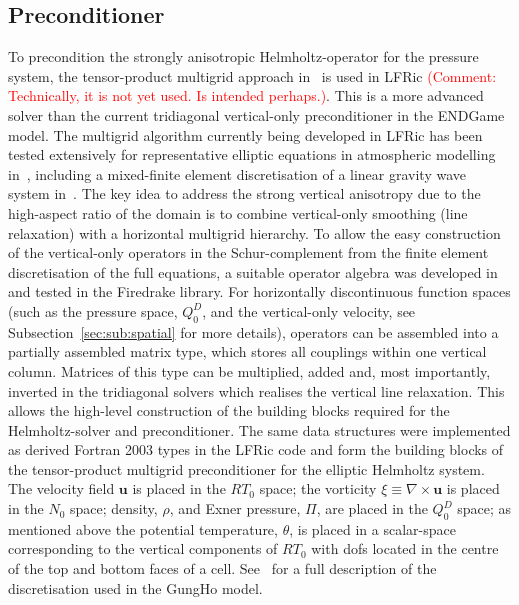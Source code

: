 \documentclass[times]{elsarticle}
\begin{document}
\subsection{\label{sec:sub:preconditioner}Preconditioner}

To precondition the strongly anisotropic Helmholtz-operator for the
pressure system, the tensor-product multigrid approach in~\cite{Borm2001} 
is used in LFRic \textcolor{red}{(Comment: Technically, it is not yet used. Is intended perhaps.)}. 
This is a more advanced solver than
the current tridiagonal vertical-only preconditioner in the ENDGame
model. The multigrid algorithm currently being developed in LFRic has been tested
extensively for representative elliptic equations in atmospheric
modelling in~\cite{Mueller2014,Dedner2016}, including a mixed-finite
element discretisation of a linear gravity wave system in~\cite{Mitchell2016}. 
The key idea to address the strong vertical
anisotropy due to the high-aspect ratio of the domain is to combine
vertical-only smoothing (line relaxation) with a horizontal multigrid
hierarchy. To allow the easy construction of the vertical-only
operators in the Schur-complement from the finite element
discretisation of the full equations, a suitable operator algebra was
developed in~\cite{Mitchell2016} and tested in the Firedrake
library. For horizontally discontinuous function spaces (such as the
pressure space, $Q_0^D$, and the vertical-only velocity, see
Subsection~\ref{sec:sub:spatial} for more details), operators can be
assembled into a partially assembled matrix type, which stores all
couplings within one vertical column. Matrices of this type can be
multiplied, added and, most importantly, inverted in the tridiagonal
solvers which realises the vertical line relaxation. This allows the
high-level construction of the building blocks required for the
Helmholtz-solver and preconditioner. The same data structures were
implemented as derived Fortran 2003 types in the LFRic code and form
the building blocks of the tensor-product multigrid preconditioner for
the elliptic Helmholtz system.
The velocity field $\mathbf{u}$ is placed in the $RT_0$ space; the vorticity 
$\xi\equiv\nabla\times\mathbf{u}$ is placed in the $N_0$ space; density, $\rho$, 
and Exner pressure, $\Pi$, are placed in the $Q_0^D$ space; as mentioned above 
the potential temperature, $\theta$, is placed in a scalar-space corresponding 
to the vertical components of $RT_0$ with dofs located in the
centre of the top and bottom faces of a cell. See~\cite{melvin2018} for a full
description of the discretisation used in the GungHo model.
\end{document}
